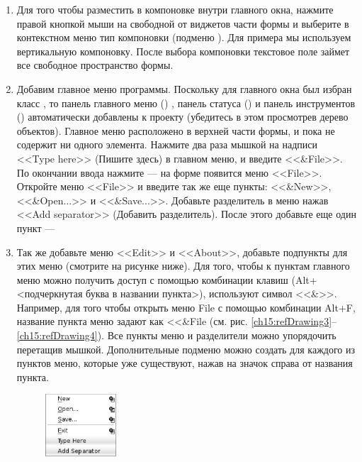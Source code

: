\begin{enumerate}
\item Для того чтобы разместить  в компоновке внутри главного окна, нажмите правой
кнопкой мыши на свободной от виджетов части формы и выберите в контекстном меню тип компоновки (подменю
). Для примера мы используем вертикальную компоновку. После выбора компоновки текстовое
поле займет все свободное пространство формы.
\item Добавим главное меню программы. Поскольку для главного окна был избран класс , то панель главного меню
() , панель статуса () и панель инструментов () автоматически добавлены к проекту (убедитесь в этом просмотрев дерево объектов). Главное меню расположено в верхней части формы, и пока не содержит ни одного
элемента. Нажмите два раза мышкой на надписи <<Type here>> (Пишите здесь) в главном меню, и введите <<\&File>>. По окончании
ввода нажмите  --- на форме появится меню <<File>>. Откройте меню <<File>> и введите так же
еще пункты: <<\&New>>, <<\&Open...>> и <<\&Save...>>. Добавьте разделитель в меню
нажав <<Add separator>> (Добавить разделитель). После этого добавьте еще один пункт ---  
\item Так же добавьте меню <<Edit>> и <<About>>, добавьте подпункты для этих меню (смотрите на
рисунке ниже). Для того, чтобы к пунктам главного меню можно получить доступ с помощью комбинации клавиш
(Alt+<подчеркнутая буква в названии пункта>), используют символ <<\&>>. Например,
для того чтобы открыть меню File с помощью комбинации Alt+F, название пункта меню задают как <<\&File
(см. рис. \ref{ch15:refDrawing3}--\ref{ch15:refDrawing4}). Все пункты меню и разделители можно упорядочить перетащив
мышкой. Дополнительные подменю можно создать для каждого из пунктов меню, которые уже существуют, нажав на значок
справа от названия пункта. 

{\footnotesize
   \begin{figure}%
   \begin{floatrow}[3]
   {\includegraphics[width=0.25\textwidth,keepaspectratio]{img/ris_15_4}}\hspace*{0.03\textwidth}


\end{floatrow}
\end{figure}}
\end{enumerate}

